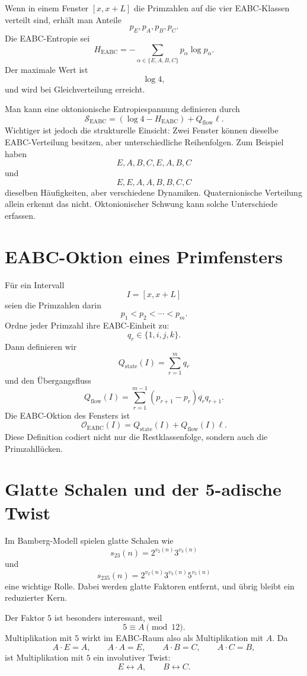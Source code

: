 \documentclass[11pt,a4paper]{article}
\theoremstyle{definition}
\theoremstyle{plain}
\newcommand{\EABC}{\mathrm{EABC}}
\newcommand{\conj}[1]{\overline{#1}}
\begin{document}
	Wenn in einem Fenster $[x,x+L]$ die Primzahlen auf die vier EABC-Klassen verteilt sind, erhält man Anteile
	\[
	p_E,p_A,p_B,p_C.
	\]
	Die EABC-Entropie sei
	\[
	H_{\EABC}
	=
	-\sum_{\alpha\in\{E,A,B,C\}}p_\alpha\log p_\alpha.
	\]
	Der maximale Wert ist
	\[
	\log 4,
	\]
	und wird bei Gleichverteilung erreicht.
	
	Man kann eine oktonionische Entropiespannung definieren durch
	\[
	\mathcal S_{\EABC}
	=
	(\log 4-H_{\EABC})+Q_{\mathrm{flow}}\ell.
	\]
	Wichtiger ist jedoch die strukturelle Einsicht: Zwei Fenster können dieselbe EABC-Verteilung besitzen, aber unterschiedliche Reihenfolgen. Zum Beispiel haben
	\[
	E,A,B,C,E,A,B,C
	\]
	und
	\[
	E,E,A,A,B,B,C,C
	\]
	dieselben Häufigkeiten, aber verschiedene Dynamiken. Quaternionische Verteilung allein erkennt das nicht. Oktonionischer Schwung kann solche Unterschiede erfassen.
	
	\section{EABC-Oktion eines Primfensters}
	
	Für ein Intervall
	\[
	I=[x,x+L]
	\]
	seien die Primzahlen darin
	\[
	p_1<p_2<\cdots<p_m.
	\]
	Ordne jeder Primzahl ihre EABC-Einheit zu:
	\[
	q_r\in\{1,i,j,k\}.
	\]
	Dann definieren wir
	\[
	Q_{\mathrm{state}}(I)
	=
	\sum_{r=1}^m q_r
	\]
	und den Übergangsfluss
	\[
	Q_{\mathrm{flow}}(I)
	=
	\sum_{r=1}^{m-1}
	(p_{r+1}-p_r)\conj{q_r}q_{r+1}.
	\]
	Die EABC-Oktion des Fensters ist
	\[
	\boxed{
		\mathcal O_{\EABC}(I)
		=
		Q_{\mathrm{state}}(I)+Q_{\mathrm{flow}}(I)\ell
	}.
	\]
	Diese Definition codiert nicht nur die Restklassenfolge, sondern auch die Primzahllücken.
	
	\section{Glatte Schalen und der 5-adische Twist}
	
	Im Bamberg-Modell spielen glatte Schalen wie
	\[
	s_{23}(n)=2^{v_2(n)}3^{v_3(n)}
	\]
	und
	\[
	s_{235}(n)=2^{v_2(n)}3^{v_3(n)}5^{v_5(n)}
	\]
	eine wichtige Rolle. Dabei werden glatte Faktoren entfernt, und übrig bleibt ein reduzierter Kern.
	
	Der Faktor $5$ ist besonders interessant, weil
	\[
	5\equiv A\pmod{12}.
	\]
	Multiplikation mit $5$ wirkt im EABC-Raum also als Multiplikation mit $A$. Da
	\[
	A\cdot E=A,
	\qquad
	A\cdot A=E,
	\qquad
	A\cdot B=C,
	\qquad
	A\cdot C=B,
	\]
	ist Multiplikation mit $5$ ein involutiver Twist:
	\[
	E\leftrightarrow A,
	\qquad
	B\leftrightarrow C.
	\]
	
\end{document}
